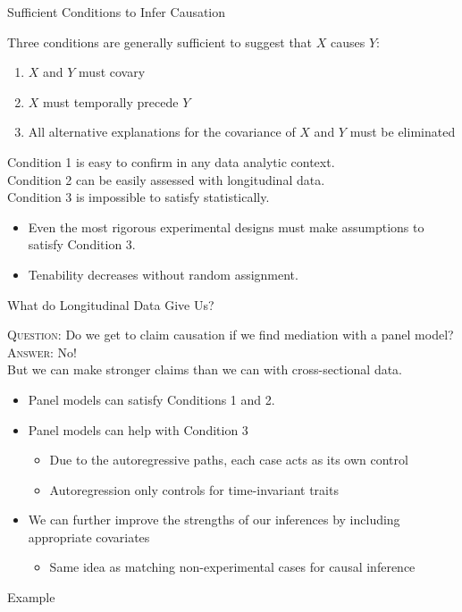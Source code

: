 \documentclass{beamer}
\newcommand{\va}[0]{\vspace{12pt}}
\newcommand{\vb}[0]{\vspace{6pt}}
\newcommand{\vc}[0]{\vspace{3pt}}
\begin{document}
\begin{frame}{Sufficient Conditions to Infer Causation}

  Three conditions are generally sufficient to suggest that $X$ causes
  $Y$:
  \vb
  \begin{enumerate}
  \item $X$ and $Y$ must covary
    \vb
  \item $X$ must temporally precede $Y$
    \vb
  \item All alternative explanations for the covariance of $X$ and $Y$
    must be eliminated
  \end{enumerate}
  \va
  \pause
  Condition 1 is easy to confirm in any data analytic context.\\
  \va
  Condition 2 can be easily assessed with longitudinal data.\\
  \va
  Condition 3 is impossible to satisfy statistically.
  \begin{itemize}
    \vb
  \item Even the most rigorous experimental designs must make
    assumptions to satisfy Condition 3.
    \vb
  \item Tenability decreases without random assignment.
  \end{itemize}

\end{frame}



\begin{frame}{What do Longitudinal Data Give Us?}
  
  \textsc{Question:} Do we get to claim causation if we find
  mediation with a panel model?\\ 
  \va 
  \pause 
  \textsc{Answer:} No!\\ 
  \va
  \pause 
  But we can make stronger claims than we can with
  cross-sectional data.
  \vb
  \begin{itemize}
  \item Panel models can satisfy Conditions 1 and 2.
    \vb
  \item Panel models can help with Condition 3
    \begin{itemize}
    \item Due to the autoregressive paths, each case acts as its own
      control
      \vb
    \item Autoregression only controls for time-invariant traits
    \end{itemize}
    \vb
  \item We can further improve the strengths of our inferences by
    including appropriate covariates
    \vc
    \begin{itemize}
    \item Same idea as matching non-experimental cases for causal inference
    \end{itemize}
  \end{itemize}
  
\end{frame}


\begin{frame}[allowframebreaks]{Example}
  


\end{frame}
\end{document}
